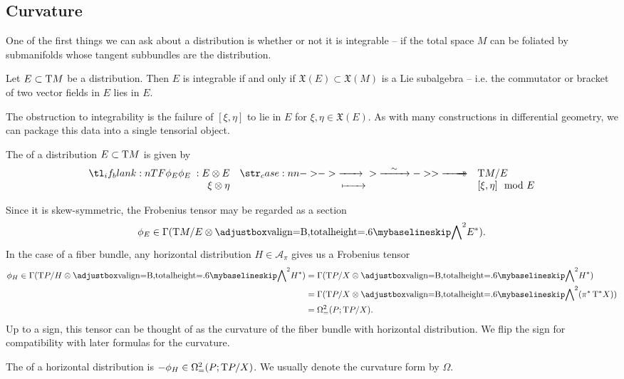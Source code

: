 
\subsection{Curvature}

One of the first things we can ask about a distribution is whether or not it is integrable -- if the total space $M$ can be foliated by submanifolds whose tangent subbundles are the distribution.

\begin{theorem}\label{thm:frobenius}
  Let $E\subset \operatorname{T}\! M$ be a distribution. Then $E$ is integrable if and only if $\mathfrak{X}(E)\subset \mathfrak{X}(M)$ is a Lie subalgebra -- i.e. the commutator or bracket of two vector fields in $E$ lies in $E$.
\end{theorem}

The obstruction to integrability is the failure of $[\xi, \eta]$ to lie in $E$ for $\xi,\eta\in \mathfrak{X}(E)$. As with many constructions in differential geometry, we can package this data into a single tensorial object.

\begin{definition}
  The  of a distribution $E\subset \operatorname{T}\! M$ is given by
  \[
    \lkxfunc{\phi_E}{E\otimes E}{\T M / E}{\xi\otimes \eta}{[\xi, \eta]\mod E}
  \]
\end{definition}

Since it is skew-symmetric, the Frobenius tensor may be regarded as a section
\[
    \phi_E \in \Gamma(\T M / E\otimes \alt^2 E^\d).
\]
In the case of a fiber bundle, any horizontal distribution $H\in \mathcal{A}_\pi$ gives us a Frobenius tensor 
\[
  \begin{aligned}
    \phi_H \in \Gamma(\T P / H\otimes \alt^2 H^\d) 
    &= \Gamma(\T P / X \otimes \alt^2 H^\d)\\ 
    &= \Gamma(\T P / X \otimes \alt^2 (\pi^* \T^\d X))\\
    &= \Omega^2_=(P; \T P/X).
  \end{aligned}
\]
Up to a sign, this tensor can be thought of as the curvature of the fiber bundle with horizontal distribution. We flip the sign for compatibility with later formulas for the curvature.
\begin{definition}
 The  of a horizontal distribution is $-\phi_H \in \Omega^2_=(P; \operatorname{T}\! P/X)$. We usually denote the curvature form by $\Omega$.
\end{definition}

